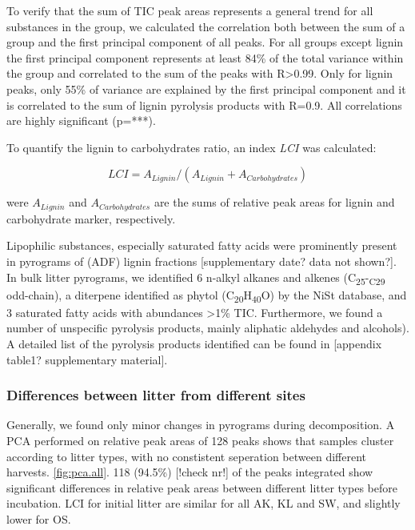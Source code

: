 To verify that the sum of TIC peak areas represents a general trend for all substances in the group, we calculated the correlation both between the sum of a group and the first principal component of all peaks. For all groups except lignin the first principal component represents at least 84\% of the total variance within the group and correlated to the sum of the peaks with R\textgreater 0.99. Only for lignin peaks, only 55\% of variance are explained by the first principal component and it is correlated to the sum of lignin pyrolysis products with R=0.9. All correlations are highly significant (p=***). 

To quantify the lignin to carbohydrates ratio, an index \emph{LCI} was calculated: 

\begin{equation}
LCI = A_{Lignin} / (A_{Lignin} + A_{Carbohydrates})
\end{equation}

were $A_{Lignin}$ and $A_{Carbohydrates}$ are the sums of relative peak areas for lignin and carbohydrate marker, respectively.

Lipophilic substances, especially saturated fatty acids were prominently present in pyrograms of (ADF) lignin fractions [supplementary date? data not shown?]. In bulk litter pyrograms, we identified 6 n-alkyl alkanes and alkenes (C\textsubscript{25}-\textsubscript{C29} odd-chain), a diterpene identified as phytol (C\textsubscript{20}H\textsubscript{40}O) by the NiSt database, and 3 saturated fatty acids with abundances \textgreater 1\% TIC. Furthermore, we found a number of unspecific pyrolysis products, mainly aliphatic aldehydes and alcohols). A detailed list of the pyrolysis products identified can be found in [appendix table1? supplementary material].

\subsubsection{Differences between litter from different sites}

Generally, we found only minor changes in pyrograms during decomposition. A PCA performed on relative peak areas of 128 peaks shows that samples cluster according to litter types, with no constistent seperation between different harvests. \ref{fig:pca.all}. 118 (94.5\%) [!check nr!] of the peaks integrated show significant differences in relative peak areas between different litter types before incubation. LCI for initial litter are similar for all AK, KL and SW, and slightly lower for OS.

